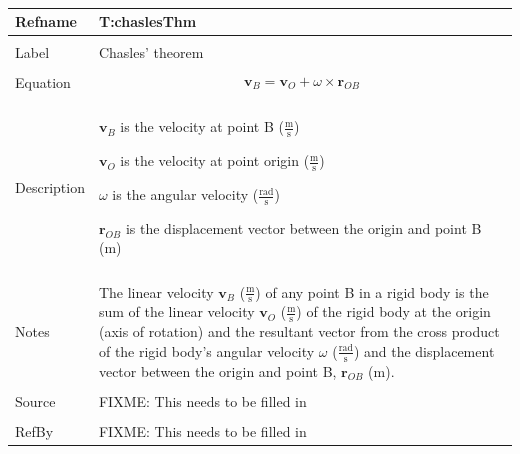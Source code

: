 \documentclass[12pt]{article}
\begin{document}
~\newline
\noindent \begin{minipage}{\textwidth}
\begin{tabular}{p{} p{}}
\toprule \textbf{Refname} & \textbf{T:chaslesThm}
\label{T:chaslesThm}
\\ \midrule \\
Label & Chasles' theorem
\\ \midrule \\
Equation & \begin{dmath}
           {\mathbf{v}_{B}}={\mathbf{v}_{O}}+ω\times{\mathbf{r}_{OB}}
           \end{dmath}
\\ \midrule \\
Description & \begin{symbDescription}
              \item{${\mathbf{v}_{B}}$ is the velocity at point B ($\frac{\text{m}}{\text{s}}$)}
              \item{${\mathbf{v}_{O}}$ is the velocity at point origin ($\frac{\text{m}}{\text{s}}$)}
              \item{$ω$ is the angular velocity ($\frac{\text{rad}}{\text{s}}$)}
              \item{${\mathbf{r}_{OB}}$ is the displacement vector between the origin and point B (m)}
              \end{symbDescription}
\\ \midrule \\
Notes & The linear velocity ${\mathbf{v}_{B}}$ ($\frac{\text{m}}{\text{s}}$) of any point B in a rigid body is the sum of the linear velocity ${\mathbf{v}_{O}}$ ($\frac{\text{m}}{\text{s}}$) of the rigid body at the origin (axis of rotation) and the resultant vector from the cross product of the rigid body's angular velocity $ω$ ($\frac{\text{rad}}{\text{s}}$) and the displacement vector between the origin and point B, ${\mathbf{r}_{OB}}$ (m).
\\ \midrule \\
Source & FIXME: This needs to be filled in
\\ \midrule \\
RefBy & FIXME: This needs to be filled in
\\ \bottomrule \end{tabular}
\end{minipage}\\
~\newline
\end{document}
